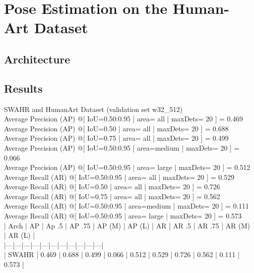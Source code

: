 \section{Pose Estimation on the Human-Art Dataset}
\label{sec:baseline_human_art}

\subsection{Architecture}
\label{sec:baseline_human_art_architecture}

\subsection{Results}
\label{sec:baseline_human_art_results}

SWAHR and HumanArt Dataset (validation set w32\_512)\\
Average Precision  (AP) @[ IoU=0.50:0.95 | area=   all | maxDets= 20 ] = 0.469\\
 Average Precision  (AP) @[ IoU=0.50      | area=   all | maxDets= 20 ] = 0.688\\
 Average Precision  (AP) @[ IoU=0.75      | area=   all | maxDets= 20 ] = 0.499\\
 Average Precision  (AP) @[ IoU=0.50:0.95 | area=medium | maxDets= 20 ] = 0.066\\
 Average Precision  (AP) @[ IoU=0.50:0.95 | area= large | maxDets= 20 ] = 0.512\\
 Average Recall     (AR) @[ IoU=0.50:0.95 | area=   all | maxDets= 20 ] = 0.529\\
 Average Recall     (AR) @[ IoU=0.50      | area=   all | maxDets= 20 ] = 0.726\\
 Average Recall     (AR) @[ IoU=0.75      | area=   all | maxDets= 20 ] = 0.562\\
 Average Recall     (AR) @[ IoU=0.50:0.95 | area=medium | maxDets= 20 ] = 0.111\\
 Average Recall     (AR) @[ IoU=0.50:0.95 | area= large | maxDets= 20 ] = 0.573\\
| Arch | AP | Ap .5 | AP .75 | AP (M) | AP (L) | AR | AR .5 | AR .75 | AR (M) | AR (L) |\\
|---|---|---|---|---|---|---|---|---|---|---|\\
| SWAHR | 0.469 | 0.688 | 0.499 | 0.066 | 0.512 | 0.529 | 0.726 | 0.562 | 0.111 | 0.573 |\\

